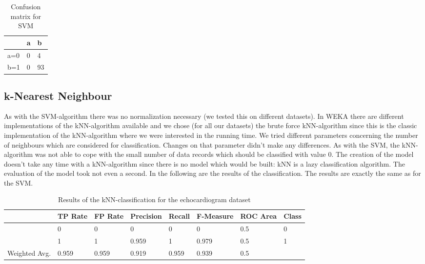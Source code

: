 \documentclass[paper=a4, fontsize=11pt]{scrartcl} %
\numberwithin{equation}{section} %
\numberwithin{figure}{section} %
\numberwithin{table}{section} %
\begin{document}
\begin{table}[h]
\centering
\begin{tabular}{|l|ll|}
\hline
 & a &	b \\
\hline
a=0 & 0 & 4 \\
b=1 & 0 & 93\\
\hline
\end{tabular}
\caption{Confusion matrix for SVM}
\end{table}



\subsection{k-Nearest Neighbour}

As with the SVM-algorithm there was no normalization necessary (we tested this on different datasets). In WEKA there are different implementations of the kNN-algorithm available and we chose (for all our datasets) the brute force kNN-algorithm since this is the classic implementation of the kNN-algorithm where we were interested in the running time. We tried different parameters concerning the number of neighbours which are considered for classification. Changes on that parameter didn't make any differences. As with the SVM, the kNN-algorithm was not able to cope with the small number of data records which should be classified with value 0. The creation of the model doesn't take any time with a kNN-algorithm since there is no model which would be built: kNN is a lazy classification algorithm. The evaluation of the model took not even a second. In the following are the results of the classification. The results are exactly the same as for the SVM.

\begin{table}[h]
\centering
\begin{tabular}{|llllllll|}
	\hline
									&TP Rate   	&FP Rate   &Precision &Recall  &F-Measure   &ROC Area  &Class\\
	\hline
									&0         	&0         &0         &0       &  0         & 0.5      &0\\
  								&1         	&1         &0.959     &1       &0.979       &	0.5      &1\\
  \hline
	Weighted Avg.		&0.959     	&0.959     &0.919   	&0.959   &0.939     	&0.5				&\\
	\hline
\end{tabular}
\caption{Results of the kNN-classification for the echocardiogram dataset}
\end{table}
\end{document}
